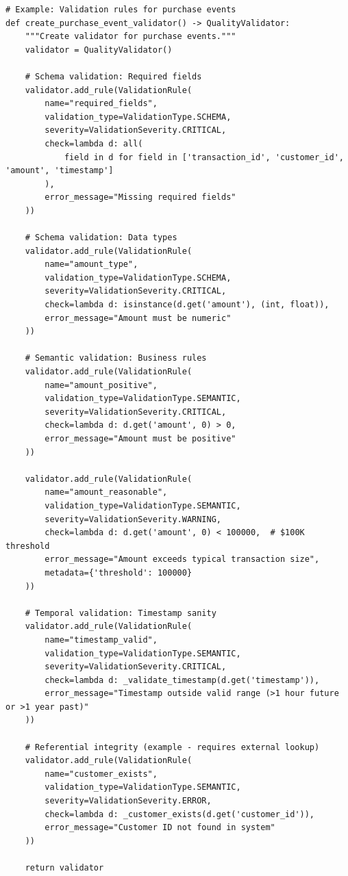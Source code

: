 \begin{lstlisting}[style=python, caption={Quality Validation Rules}]
# Example: Validation rules for purchase events
def create_purchase_event_validator() -> QualityValidator:
    """Create validator for purchase events."""
    validator = QualityValidator()

    # Schema validation: Required fields
    validator.add_rule(ValidationRule(
        name="required_fields",
        validation_type=ValidationType.SCHEMA,
        severity=ValidationSeverity.CRITICAL,
        check=lambda d: all(
            field in d for field in ['transaction_id', 'customer_id', 'amount', 'timestamp']
        ),
        error_message="Missing required fields"
    ))

    # Schema validation: Data types
    validator.add_rule(ValidationRule(
        name="amount_type",
        validation_type=ValidationType.SCHEMA,
        severity=ValidationSeverity.CRITICAL,
        check=lambda d: isinstance(d.get('amount'), (int, float)),
        error_message="Amount must be numeric"
    ))

    # Semantic validation: Business rules
    validator.add_rule(ValidationRule(
        name="amount_positive",
        validation_type=ValidationType.SEMANTIC,
        severity=ValidationSeverity.CRITICAL,
        check=lambda d: d.get('amount', 0) > 0,
        error_message="Amount must be positive"
    ))

    validator.add_rule(ValidationRule(
        name="amount_reasonable",
        validation_type=ValidationType.SEMANTIC,
        severity=ValidationSeverity.WARNING,
        check=lambda d: d.get('amount', 0) < 100000,  # $100K threshold
        error_message="Amount exceeds typical transaction size",
        metadata={'threshold': 100000}
    ))

    # Temporal validation: Timestamp sanity
    validator.add_rule(ValidationRule(
        name="timestamp_valid",
        validation_type=ValidationType.SEMANTIC,
        severity=ValidationSeverity.CRITICAL,
        check=lambda d: _validate_timestamp(d.get('timestamp')),
        error_message="Timestamp outside valid range (>1 hour future or >1 year past)"
    ))

    # Referential integrity (example - requires external lookup)
    validator.add_rule(ValidationRule(
        name="customer_exists",
        validation_type=ValidationType.SEMANTIC,
        severity=ValidationSeverity.ERROR,
        check=lambda d: _customer_exists(d.get('customer_id')),
        error_message="Customer ID not found in system"
    ))

    return validator


\end{lstlisting}
